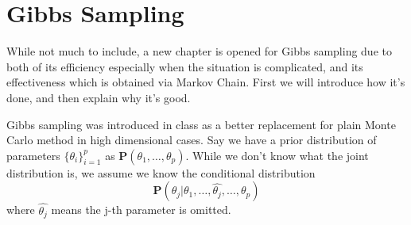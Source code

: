 \chapter{Gibbs Sampling}

While not much to include, a new chapter is opened for Gibbs sampling due to both of its efficiency especially when the situation is complicated, and its effectiveness which is obtained via Markov Chain. First we will introduce how it's done, and then explain why it's good. 

Gibbs sampling was introduced in class as a better replacement for plain Monte Carlo method in high dimensional cases. Say we have a prior distribution of parameters $\{ \theta_i \}_{i=1}^p$ as $\mathbf{P}(\theta_1, \ldots, \theta_p)$. While we don't know what the joint distribution is, we assume we know the conditional distribution 
\begin{equation*}
    \mathbf{P}(\theta_j | \theta_1, \ldots, \hat{\theta_j}, \ldots, \theta_p)
\end{equation*}
where $\hat{\theta_j}$ means the j-th parameter is omitted. 